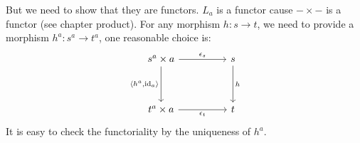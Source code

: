 \documentclass[./main.tex]{subfiles}
\begin{document}
But we need to show that they are functors. $L_a$ is a functor cause $- \times -$ is a functor
(see chapter product). For any morphism $h : s \rightarrow t$, we need to provide
a morphism $h^a : s^a \rightarrow t^a$, one reasonable choice is:
\[\begin{tikzcd}
	{s^a \times a} && s \\
	\\
	{t^a \times a} && t
	\arrow["{\epsilon_s}", from=1-1, to=1-3]
	\arrow["{\langle h^a, \mathrm{id}_a\rangle}"', from=1-1, to=3-1]
	\arrow["h", from=1-3, to=3-3]
	\arrow["{\epsilon_t}"', from=3-1, to=3-3]
\end{tikzcd}\]
It is easy to check the functoriality by the uniqueness of $h^a$.
  
\end{document}
